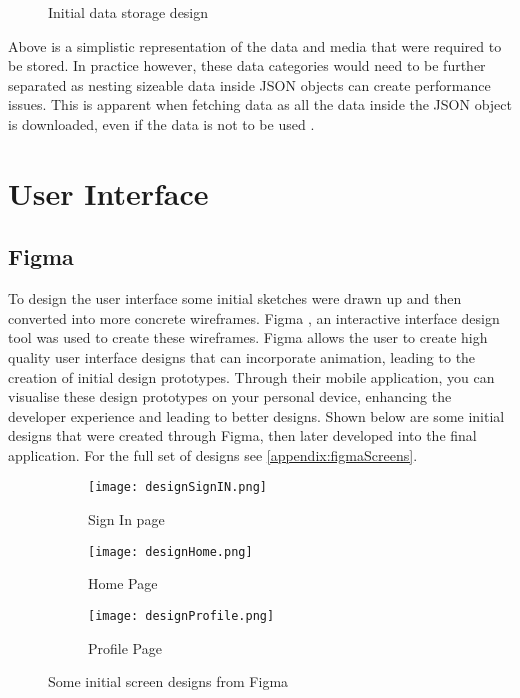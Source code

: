 \begin{figure}[!htbp]
    \centering
    \begin{subfigure}[b]{0.6\textwidth}
    \end{subfigure}
    \caption{Initial data storage design} 
    \label{fig:dataDesign}
\end{figure}
\FloatBarrier

Above is a simplistic representation of the data and media that were required to be stored.
In practice however, these data categories would need to be further separated as nesting sizeable data inside JSON objects can create performance issues. This is apparent when fetching data as all the data inside the JSON object is downloaded, even if the data is not to be used \cite{fbStructData}.

\section{User Interface}\label{UIDesign}
\subsection*{Figma}
To design the user interface some initial sketches were drawn up and then converted into more concrete wireframes. Figma \cite{figma}, an interactive interface design tool was used to create these wireframes. Figma allows the user to create high quality user interface designs that can incorporate animation, leading to the creation of initial design prototypes. Through their mobile application, you can visualise these design prototypes on your personal device, enhancing the developer experience and leading to better designs. Shown below are some initial designs that were created through Figma, then later developed into the final application. For the full set of designs see \ref{appendix:figmaScreens}.

\begin{figure}[!htbp]
    \centering
    \begin{subfigure}[b]{0.25\textwidth}
        \texttt{[image: designSignIN.png]}
        \caption{Sign In page}
    \end{subfigure}
    \hspace{1.5em}
    \begin{subfigure}[b]{0.25\textwidth}
        \texttt{[image: designHome.png]}
        \caption{Home Page}
    \end{subfigure}
    \hspace{1.5em}
    \begin{subfigure}[b]{0.25\textwidth}
        \texttt{[image: designProfile.png]}
        \caption{Profile Page}
    \end{subfigure}
    \caption{Some initial screen designs from Figma}
    \label{fig:figma}
\end{figure}
\FloatBarrier

